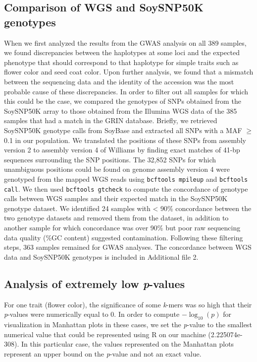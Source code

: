 \subsection*{Comparison of WGS and SoySNP50K genotypes}
\label{annexe-sv-gwas-soysnp50k}
When we first analyzed the results from the GWAS analysis on all 389 samples,
we found discrepancies between the haplotypes at some loci and the expected
phenotype that should correspond to that haplotype for simple traits such as
flower color and seed coat color. Upon further analysis, we found that a
mismatch between the sequencing data and the identity of the accession was the
most probable cause of these discrepancies. In order to filter out all samples
for which this could be the case, we compared the genotypes of SNPs obtained
from the SoySNP50K array \cite{song2013} to those obtained from the Illumina WGS
data of the 385 samples that had a match in the GRIN database. Briefly, we
retrieved SoySNP50K genotype calls from SoyBase \citep{grant2010} and extracted
all SNPs with a MAF $\geq$ 0.1 in our population. We translated the positions
of these SNPs from assembly version 2 to assembly version 4 of Williams by
finding exact matches of 41-bp sequences surrounding the SNP positions. The
32,852 SNPs for which unambiguous positions could be found on genome assembly
version 4 were genotyped from the mapped WGS reads using \texttt{bcftools
mpileup} and \texttt{bcftools call}. We then used \texttt{bcftools gtcheck} to
compute the concordance of genotype calls between WGS samples and their
expected match in the SoySNP50K genotype dataset.  We identified 24 samples
with < 90\% concordance between the two genotype datasets and removed them from
the dataset, in addition to another sample for which concordance was over 90\%
but poor raw sequencing data quality (\%GC content) suggested contamination.
Following these filtering steps, 363 samples remained for GWAS analyses. The
concordance between WGS data and SoySNP50K genotypes is included in
Additional file 2.

\subsection*{Analysis of extremely low \textit{p}-values}
\label{annexe-sv-gwas-pvalues}

For one trait (flower color), the significance of some \emph{k}-mers was so
high that their \emph{p}-values were numerically equal to 0. In order to
compute $-\log_{10} (p)$ for visualization in Manhattan plots in these cases,
we set the \emph{p}-value to the smallest numerical value that could be
represented using R on our machine (2.225074e-308). In this particular case,
the values represented on the Manhattan plots represent an upper bound on the
\emph{p}-value and not an exact value.


